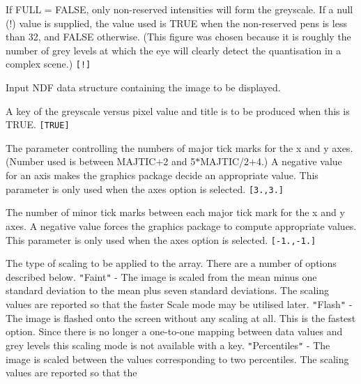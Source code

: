 \documentclass[twoside,11pt]{article}
\newcommand{\sstsubsection}[1]{ \item[{#1}] \mbox{} \\}
\renewcommand{\sstsubsection}[1]{\item[{#1}]}
\begin{document}
{{{         If FULL = FALSE, only non-reserved intensities will form the
         greyscale.  If a null (!) value is supplied, the value used is
         TRUE when the non-reserved pens is less than 32, and FALSE
         otherwise.  (This figure was chosen because it is roughly the
         number of grey levels at which the eye will clearly detect the
         quantisation in a complex scene.) {\tt [!]}
      }
      \sstsubsection{
         IN = NDF (Read)
      }{
         Input NDF data structure containing the image to be displayed.
      }
      \sstsubsection{
         KEY = \_LOGICAL (Read)
      }{
         A key of the greyscale versus pixel value and title is to be
         produced when this is TRUE. {\tt [TRUE]}
      }
      \sstsubsection{
         MAJTIC( 2 ) = \_REAL (Read)
      }{
         The parameter controlling the numbers of major tick marks
         for the x and y axes.  (Number used is between MAJTIC$+$2 and
         5$*$MAJTIC/2$+$4.)   A negative value for an axis makes the
         graphics package decide an appropriate value.  This parameter
         is only used when the axes option is selected. {\tt [3.,3.]}
      }
      \sstsubsection{
         MINTIC( 2 ) = \_REAL (Read)
      }{
         The number of minor tick marks between each major tick mark
         for the x and y axes.  A negative value forces the graphics
         package to compute appropriate values.   This parameter is
         only used when the axes option is selected. {\tt [-1.,-1.]}
      }
      \sstsubsection{
         MODE = LITERAL (Read)
      }{
         The type of scaling to be applied to the array.  There are a
         number of options described below.
           {\tt "}Faint{\tt "}       - The image is scaled from the mean minus one
                           standard deviation to the mean plus seven
                           standard deviations.  The scaling values are
                           reported so that the faster Scale mode may be
                           utilised later.
           {\tt "}Flash{\tt "}       - The image is flashed onto the screen without
                           any scaling at all.  This is the fastest
                           option.  Since there is no longer a
                           one-to-one mapping between data values and
                           grey levels this scaling mode is not
                           available with a key.
           {\tt "}Percentiles{\tt "} - The image is scaled between the values
                           corresponding to two percentiles.  The
                           scaling values are reported so that the
}}}
\end{document}
